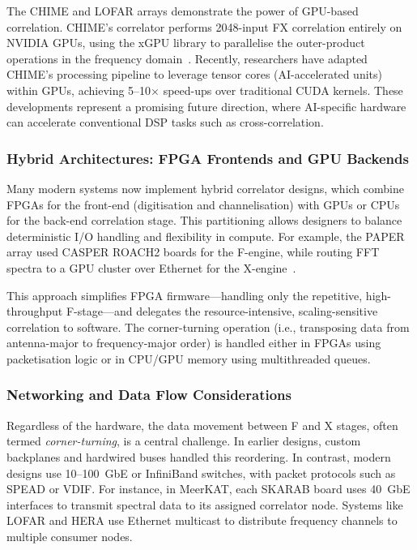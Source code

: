         The CHIME and LOFAR arrays demonstrate the power of GPU-based correlation. CHIME’s correlator performs 2048-input FX correlation entirely on NVIDIA GPUs, using the xGPU library to parallelise the outer-product operations in the frequency domain~\cite{Romein2021}. Recently, researchers have adapted CHIME’s processing pipeline to leverage tensor cores (AI-accelerated units) within GPUs, achieving 5–10$\times$ speed-ups over traditional CUDA kernels. These developments represent a promising future direction, where AI-specific hardware can accelerate conventional DSP tasks such as cross-correlation.

        \subsubsection{Hybrid Architectures: FPGA Frontends and GPU Backends}
        Many modern systems now implement hybrid correlator designs, which combine FPGAs for the front-end (digitisation and channelisation) with GPUs or CPUs for the back-end correlation stage. This partitioning allows designers to balance deterministic I/O handling and flexibility in compute. For example, the PAPER array used CASPER ROACH2 boards for the F-engine, while routing FFT spectra to a GPU cluster over Ethernet for the X-engine~\cite{Kocz2014}.

        This approach simplifies FPGA firmware—handling only the repetitive, high-throughput F-stage—and delegates the resource-intensive, scaling-sensitive correlation to software. The corner-turning operation (i.e., transposing data from antenna-major to frequency-major order) is handled either in FPGAs using packetisation logic or in CPU/GPU memory using multithreaded queues.

        \subsubsection{Networking and Data Flow Considerations}
        Regardless of the hardware, the data movement between F and X stages, often termed \textit{corner-turning}, is a central challenge. In earlier designs, custom backplanes and hardwired buses handled this reordering. In contrast, modern designs use 10--100~GbE or InfiniBand switches, with packet protocols such as SPEAD or VDIF. For instance, in MeerKAT, each SKARAB board uses 40~GbE interfaces to transmit spectral data to its assigned correlator node. Systems like LOFAR and HERA use Ethernet multicast to distribute frequency channels to multiple consumer nodes.

